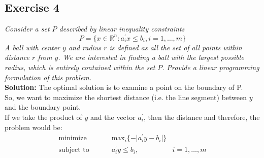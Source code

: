 \documentclass[12pt]{article}
\newcommand{\R}{\mathbb{R}}
\begin{document}
\newpage

\subsection*{Exercise 4}
\textit{Consider a set $P$ described by linear inequality constraints 
$$P = \lbrace x \in \R^n : a_i^{\prime}x  \leqslant b_i, i = 1, \ldots, m \rbrace$$
A ball with center $y$ and radius $r$ is defined as all the set of all points within distance $r$ from $y$. We are interested in finding a ball with the largest possible radius, which is entirely contained within the set $P$. Provide a linear programming formulation of this problem. } \\
\textbf{Solution:}
The optimal solution is to examine a point on the boundary of P. \\
So, we want to maximize the shortest distance (i.e. the line segment) between $y$ and the boundary point. \\
If we take the product of $y$ and the vector $a_i^{\prime}$, then the distance and therefore, the problem would be: 
	\begin{align*}
		\text{minimize }  \qquad   &\text{max}_i{\lbrace -\vert a_i^{\prime}y - b_i \vert \rbrace} 	\\
		\text{subject to }  \qquad &a_i^{\prime}y \leqslant b_i, \qquad &i = 1, \ldots, m
	\end{align*}
\end{document}
